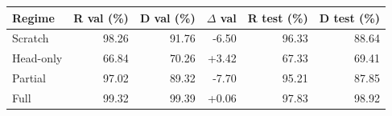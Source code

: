 \begin{tabular}{lrrrrr}
\toprule
Regime & R val (\%) & D val (\%) & $\Delta$ val & R test (\%) & D test (\%)\\
\midrule
Scratch & 98.26 & 91.76 & -6.50 & 96.33 & 88.64\\
Head-only & 66.84 & 70.26 & +3.42 & 67.33 & 69.41\\
Partial & 97.02 & 89.32 & -7.70 & 95.21 & 87.85\\
Full & 99.32 & 99.39 & +0.06 & 97.83 & 98.92\\
\bottomrule
\end{tabular}
